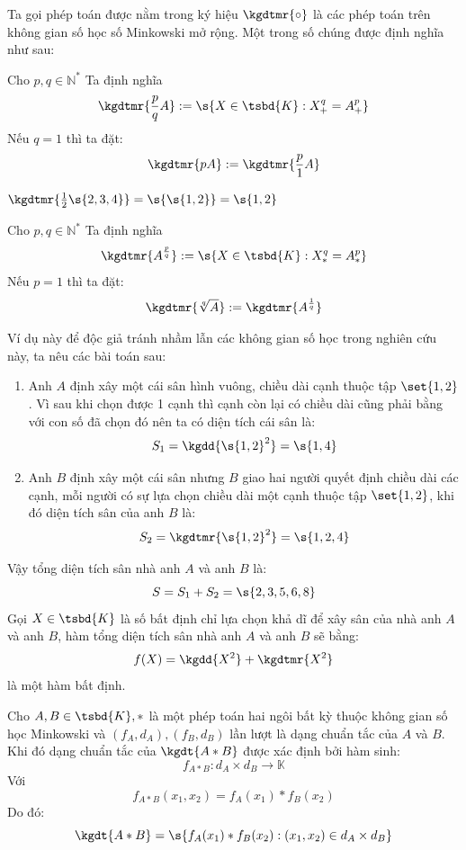 \par{Ta gọi phép toán được nằm trong ký hiệu $\kgdtmr{\circ}$ là các phép toán trên không gian số học số Minkowski mở rộng. Một trong số chúng được định nghĩa như sau:}
\begin{definition}
	Cho $p,q \in \mathbb{N}^*$
	Ta định nghĩa \[\kgdtmr{\frac{p}{q}A} := \s{X \in \tsbd{K}: X^q_+ = A^p_+} \]
	Nếu $q = 1$ thì ta đặt:  \[\kgdtmr{pA}:= \kgdtmr{\frac{p}{1} A} \]
\end{definition}
\begin{example}
	$\kgdtmr{\frac{1}{2} \s{2,3,4}} = \s{\s{1,2}} = \s{1,2}$
\end{example}
\begin{definition}
	Cho $p,q \in \mathbb{N^*}$
	Ta định nghĩa \[\kgdtmr{A^{\frac{p}{q}}} := \s{X \in \tsbd{K}: X^q_* = A^p_*} \]
	Nếu $p = 1$  thì ta đặt: \[\kgdtmr{\sqrt[q]{A}} := \kgdtmr{A^{\frac{1}{q}}}\]
\end{definition}
\begin{example}
	Ví dụ này để độc giả tránh nhầm lẫn các không gian số học trong nghiên cứu này, ta nêu các bài toán sau:
	\begin{enumerate}
		\item Anh $A$ định xây một cái sân hình vuông, chiều dài cạnh thuộc tập $\set{1,2}$. Vì sau khi chọn được 1 cạnh thì cạnh còn lại có chiều dài cũng phải bằng với con số đã chọn đó nên ta có diện tích cái sân là: \[S_1 = \kgdd{\s{1,2}^2} = \s{1,4}\]
		\item Anh $B$ định xây một cái sân nhưng $B$ giao hai người quyết định chiều dài các cạnh, mỗi người có sự lựa chọn chiều dài một cạnh thuộc tập $\set{1,2}$, khi đó diện tích sân của anh $B$ là:
		\[S_2 = \kgdtmr{\s{1,2}^2} =\s{1,2,4}\]
	\end{enumerate}
	Vậy tổng diện tích sân nhà anh $A$ và anh $B$ là:\[S= S_1 + S_2 = \s{2, 3, 5, 6, 8}\]
	Gọi $X \in \tsbd{K}$ là số bất định chỉ lựa chọn khả dĩ để xây sân của nhà anh $A$ và anh $B$, hàm tổng diện tích sân nhà anh $A$ và anh $B$ sẽ bằng:
	\[f(X) = \kgdd{X^2} + \kgdtmr{X^2}\] là một hàm bất định.
\end{example}
\begin{theorem}
	Cho $A,B \in \tsbd{K}, *$ là một phép toán hai ngôi bất kỳ thuộc không gian số học Minkowski và $ (f_A,d_A), (f_B,d_B)$ lần lượt là dạng chuẩn tắc của $A$ và $B$. Khi đó dạng chuẩn tắc của $\kgdt{A * B}$ được xác định bởi hàm sinh:
	\[f_{A*B} : d_A \times d_B \to  \mathbb{K}\]
	Với \[f_{A*B}(x_1,x_2) = f_A(x_1) * f_B(x_2)\]
	Do đó: \[\kgdt{A*B} = \s{f_A(x_1)*f_B(x_2) : (x_1,x_2) \in d_A \times d_B}\]
\end{theorem}
